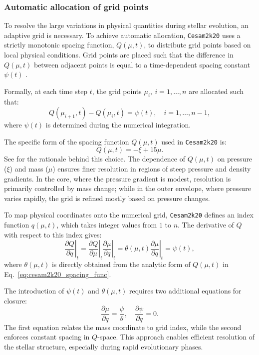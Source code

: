 \documentclass[12pt,a4paper]{article}
\newcommand{\pfird}[2][]{\frac{\partial#1}{\partial#2}}
\begin{document}
\subsubsection{Automatic allocation of grid points}
\label{sec:cesam2k20_grid}

To resolve the large variations in physical quantities during stellar evolution, an adaptive grid is necessary. To achieve automatic allocation, \texttt{Cesam2k20} uses a strictly monotonic spacing function, $Q(\mu, t)$, to distribute grid points based on local physical conditions. Grid points are placed such that the difference in $Q(\mu, t)$ between adjacent points is equal to a time-dependent spacing constant $\psi(t)$ \parencite{Eggleton1971,PressEtAl1992,Morel1997}.

Formally, at each time step $t$, the grid points $\mu_i,\ i = 1,\ldots,n$ are allocated such that:
\begin{equation}
  Q(\mu_{i+1}, t) - Q(\mu_i, t) = \psi(t),\quad i = 1, \ldots, n-1,
\end{equation}
where $\psi(t)$ is determined during the numerical integration. 

The specific form of the spacing function $Q(\mu, t)$ used in \texttt{Cesam2k20} is:
\begin{equation}
  Q(\mu, t) = -\xi + 15\mu. \label{eq:cesam2k20_spacing_func}
\end{equation}
See \textcite{Morel1997,Manchon2021} for the rationale behind this choice. The dependence of $Q(\mu, t)$ on pressure ($\xi$) and mass ($\mu$) ensures finer resolution in regions of steep pressure and density gradients. In the core, where the pressure gradient is modest, resolution is primarily controlled by mass change; while in the outer envelope, where pressure varies rapidly, the grid is refined mostly based on pressure changes.

To map physical coordinates onto the numerical grid, \texttt{Cesam2k20} defines an index function $q(\mu, t)$, which takes integer values from $1$ to $n$. The derivative of $Q$ with respect to this index gives:
\begin{equation}
  \left.\pfird[Q]{q}\right|_t = \left.\pfird[Q]{\mu}\right|_t\left.\pfird[\mu]{q}\right|_t = \theta(\mu, t)\left.\pfird[\mu]{q}\right|_t = \psi(t),
\end{equation}
where $\theta(\mu, t)$ is directly obtained from the analytic form of $Q(\mu, t)$ in Eq.~\eqref{eq:cesam2k20_spacing_func}.

The introduction of $\psi(t)$ and $\theta(\mu, t)$ requires two additional equations for closure:
\begin{equation}
  \pfird[\mu]{q} = \frac{\psi}{\theta},\quad \pfird[\psi]{q} = 0.
\end{equation}
The first equation relates the mass coordinate to grid index, while the second enforces constant spacing in $Q$-space. This approach enables efficient resolution of the stellar structure, especially during rapid evolutionary phases.
\end{document}
